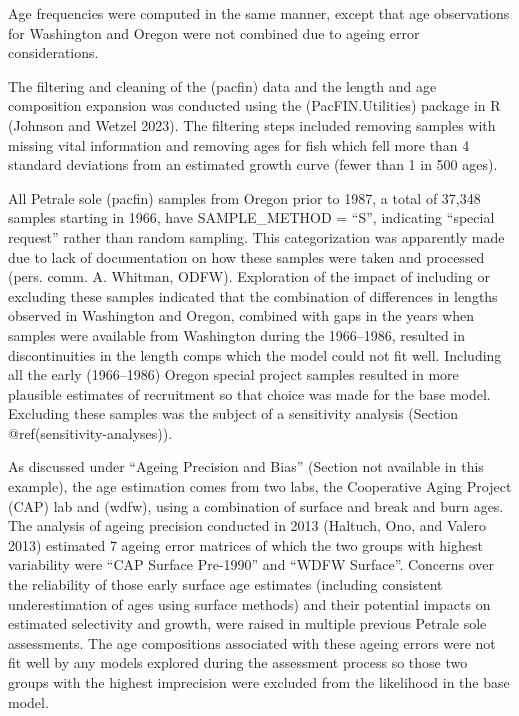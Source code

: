 \documentclass[
]{scrartcl}
\begin{document}
Age frequencies were computed in the same manner, except that age
observations for Washington and Oregon were not combined due to ageing
error considerations.

The filtering and cleaning of the (pacfin) data and the length and age
composition expansion was conducted using the (PacFIN.Utilities) package
in R (Johnson and Wetzel 2023). The filtering steps included removing
samples with missing vital information and removing ages for fish which
fell more than 4 standard deviations from an estimated growth curve
(fewer than 1 in 500 ages).

All Petrale sole (pacfin) samples from Oregon prior to 1987, a total of
37,348 samples starting in 1966, have SAMPLE\_METHOD = ``S'', indicating
``special request'' rather than random sampling. This categorization was
apparently made due to lack of documentation on how these samples were
taken and processed (pers. comm. A. Whitman, ODFW). Exploration of the
impact of including or excluding these samples indicated that the
combination of differences in lengths observed in Washington and Oregon,
combined with gaps in the years when samples were available from
Washington during the 1966--1986, resulted in discontinuities in the
length comps which the model could not fit well. Including all the early
(1966--1986) Oregon special project samples resulted in more plausible
estimates of recruitment so that choice was made for the base model.
Excluding these samples was the subject of a sensitivity analysis
(Section @ref(sensitivity-analyses)).

As discussed under ``Ageing Precision and Bias'' (Section not available
in this example), the age estimation comes from two labs, the
Cooperative Aging Project (CAP) lab and (wdfw), using a combination of
surface and break and burn ages. The analysis of ageing precision
conducted in 2013 (Haltuch, Ono, and Valero 2013) estimated 7 ageing
error matrices of which the two groups with highest variability were
``CAP Surface Pre-1990'' and ``WDFW Surface''. Concerns over the
reliability of those early surface age estimates (including consistent
underestimation of ages using surface methods) and their potential
impacts on estimated selectivity and growth, were raised in multiple
previous Petrale sole assessments. The age compositions associated with
these ageing errors were not fit well by any models explored during the
assessment process so those two groups with the highest imprecision were
excluded from the likelihood in the base model.
\end{document}

